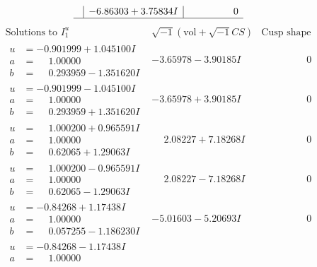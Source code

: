 \documentclass[1p]{elsarticle_modified}
\theoremstyle{definition}
\newcommand{\I}{\sqrt{-1}}
\begin{document}
$$\begin{array}{c|c|c}
 & -6.86303 + 3.75834 I & \phantom{-0.000000 } 0\\
 \hline 
 \end{array}$$\newpage$$\begin{array}{c|c|c}  
\text{Solutions to }I^u_{1}& \I (\text{vol} + \sqrt{-1}CS) & \text{Cusp shape}\\
 \hline 
\begin{aligned}
u &= -0.901999 + 1.045100 I \\
a &= \phantom{-}1.00000\phantom{ +0.000000I} \\
b &= \phantom{-}0.293959 - 1.351620 I\end{aligned}
 & -3.65978 - 3.90185 I & \phantom{-0.000000 } 0 \\ \hline\begin{aligned}
u &= -0.901999 - 1.045100 I \\
a &= \phantom{-}1.00000\phantom{ +0.000000I} \\
b &= \phantom{-}0.293959 + 1.351620 I\end{aligned}
 & -3.65978 + 3.90185 I & \phantom{-0.000000 } 0 \\ \hline\begin{aligned}
u &= \phantom{-}1.000200 + 0.965591 I \\
a &= \phantom{-}1.00000\phantom{ +0.000000I} \\
b &= \phantom{-}0.62065 + 1.29063 I\end{aligned}
 & \phantom{-}2.08227 + 7.18268 I & \phantom{-0.000000 } 0 \\ \hline\begin{aligned}
u &= \phantom{-}1.000200 - 0.965591 I \\
a &= \phantom{-}1.00000\phantom{ +0.000000I} \\
b &= \phantom{-}0.62065 - 1.29063 I\end{aligned}
 & \phantom{-}2.08227 - 7.18268 I & \phantom{-0.000000 } 0 \\ \hline\begin{aligned}
u &= -0.84268 + 1.17438 I \\
a &= \phantom{-}1.00000\phantom{ +0.000000I} \\
b &= \phantom{-}0.057255 - 1.186230 I\end{aligned}
 & -5.01603 - 5.20693 I & \phantom{-0.000000 } 0 \\ \hline\begin{aligned}
u &= -0.84268 - 1.17438 I \\
a &= \phantom{-}1.00000\phantom{ +0.000000I} \\

\end{aligned}
\end{array}$$
\end{document}
